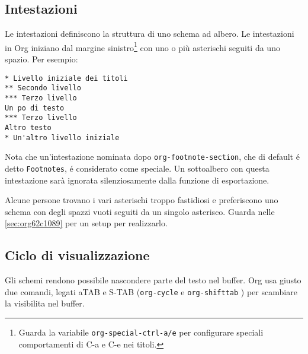 \documentclass[11pt]{article}
\begin{document}
\subsection{Intestazioni}
\label{sec:orgf5b2a10}
Le intestazioni definiscono la struttura di uno schema ad albero. Le
intestazioni in Org iniziano dal margine sinistro\footnote{Guarda la variabile \texttt{org-special-ctrl-a/e} per configurare
speciali comportamenti di C-a e C-e nei titoli.} con uno o più
asterischi seguiti da uno spazio. Per esempio:

\begin{verbatim}
* Livello iniziale dei titoli
** Secondo livello
*** Terzo livello
Un po di testo
*** Terzo livello
Altro testo
* Un'altro livello iniziale
\end{verbatim}

Nota che un'intestazione nominata dopo \texttt{org-footnote-section}, che di default
é detto \texttt{Footnotes}, é considerato come speciale. Un sottoalbero con questa
intestazione sarà ignorata silenziosamente dalla funzione di esportazione.

Alcune persone trovano i vari asterischi troppo fastidiosi e preferiscono
uno schema con degli spazzi vuoti seguiti da un singolo asterisco. Guarda
nelle \ref{sec:org62c1089} per un setup per realizzarlo.

\subsection{Ciclo di visualizzazione}
\label{sec:org7e708e6}
Gli schemi rendono possibile nascondere parte del testo nel buffer. Org usa
giusto due comandi, legati aTAB e S-TAB (\texttt{org-cycle} e
\texttt{org-shifttab} ) per scambiare la visibilita nel buffer.
\end{document}
